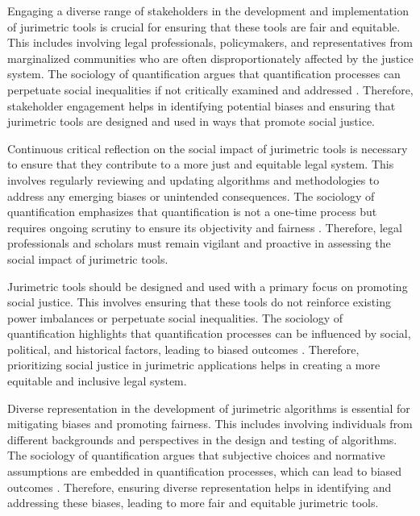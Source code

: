 Engaging a diverse range of stakeholders in the development and implementation of jurimetric tools is crucial for ensuring that these tools are fair and equitable. This includes involving legal professionals, policymakers, and representatives from marginalized communities who are often disproportionately affected by the justice system. The sociology of quantification argues that quantification processes can perpetuate social inequalities if not critically examined and addressed \cite{10.1007/s11186-021-09453-1,loevinger1959}. Therefore, stakeholder engagement helps in identifying potential biases and ensuring that jurimetric tools are designed and used in ways that promote social justice.

Continuous critical reflection on the social impact of jurimetric tools is necessary to ensure that they contribute to a more just and equitable legal system. This involves regularly reviewing and updating algorithms and methodologies to address any emerging biases or unintended consequences. The sociology of quantification emphasizes that quantification is not a one-time process but requires ongoing scrutiny to ensure its objectivity and fairness \cite{10.1007/s11186-021-09453-1,loevinger1959}. Therefore, legal professionals and scholars must remain vigilant and proactive in assessing the social impact of jurimetric tools.

Jurimetric tools should be designed and used with a primary focus on promoting social justice. This involves ensuring that these tools do not reinforce existing power imbalances or perpetuate social inequalities. The sociology of quantification highlights that quantification processes can be influenced by social, political, and historical factors, leading to biased outcomes \cite{10.1007/s11186-021-09453-1,loevinger1959}. Therefore, prioritizing social justice in jurimetric applications helps in creating a more equitable and inclusive legal system.

Diverse representation in the development of jurimetric algorithms is essential for mitigating biases and promoting fairness. This includes involving individuals from different backgrounds and perspectives in the design and testing of algorithms. The sociology of quantification argues that subjective choices and normative assumptions are embedded in quantification processes, which can lead to biased outcomes \cite{10.1007/s11186-021-09453-1,loevinger1959}. Therefore, ensuring diverse representation helps in identifying and addressing these biases, leading to more fair and equitable jurimetric tools.

